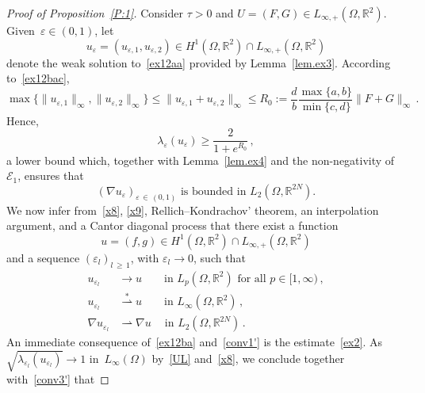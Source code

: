\documentclass[10pt]{amsart}
\theoremstyle{definition}\newtheorem{defi}[theo]{Definition}\newtheorem{rema}[theo]{Remark}\newtheorem{exam}[theo]{Example}\newtheorem{exem}[theo]{Example}\newtheorem{nota}[theo]{Notation}
\newcommand{\bbR}{\mathbb{R}}
\newcommand{\clE}{\mathcal{E}}
\begin{document}
\begin{proof}[Proof of Proposition~\ref{P:1}]
Consider $\tau>0$ and $U=(F,G)\in L_{\infty,+}(\Omega,\bbR^2)$. Given~$\varepsilon\in (0,1)$, let
\begin{equation*}
u_\varepsilon =(u_{\varepsilon,1},u_{\varepsilon,2}) \in H^1\left(\Omega,\bbR^2\right)\cap L_{\infty,+}\left(\Omega,\bbR^2\right)
\end{equation*}
denote the weak solution to~\eqref{ex12aa} provided by Lemma~\ref{lem.ex3}. According to~\eqref{ex12bac},
\begin{equation}\label{x8}
\max\{\|u_{\varepsilon,1}\|_\infty, \| u_{\varepsilon,2}\|_\infty \} \le\|u_{\varepsilon,1}+ u_{\varepsilon,2}\|_\infty \le R_0 := \frac{d}{b} \frac{\max\{a,b\}}{\min\{c,d\}} \|F+G\|_\infty\,. 
\end{equation}
Hence,
\begin{equation*}
\lambda_\varepsilon(u_\varepsilon) \ge \frac{2}{1+e^{R_0}}\,,
\end{equation*}
a lower bound which, together with Lemma~\ref{lem.ex4} and the non-negativity of $\clE_1$, ensures that
\begin{equation}\label{x9}
(\nabla u_{\varepsilon})_{\varepsilon\,\in\,(0,1)} \text{ is bounded in }L_2\left(\Omega,\bbR^{2N}\right). 
\end{equation}
We now infer from~\eqref{x8}, \eqref{x9}, Rellich--Kondrachov' theorem, an interpolation argument, and a Cantor diagonal process that there exist a function
\begin{equation*}
u=(f,g)\in H^1\left(\Omega,\bbR^2\right)\cap L_{\infty,+}\left(\Omega,\bbR^2\right)
\end{equation*}
and a sequence $(\varepsilon_l)_{l\,\ge\,1}$, with $\varepsilon_l\to 0$, such that
\begin{align}
u_{\varepsilon_l}&\to u\qquad\text{in }L_p\left(\Omega,\bbR^2\right)\text{ for all }p\in [1,\infty)\,,\label{conv1'}
\\[1ex] u_{\varepsilon_l}&\overset{*}\rightharpoonup u\qquad \text{in }L_\infty\left(\Omega,\bbR^2\right)\,,\label{conv2'}
\\[1ex]
\nabla u_{\varepsilon_l}&\rightharpoonup \nabla u\quad\: \text{in }L_2\left(\Omega,\bbR^{2N}\right)\,.\label{conv3'}
\end{align}
An immediate consequence of~\eqref{ex12ba} and~\eqref{conv1'} is the estimate~\eqref{ex2}. As~${\sqrt{\lambda_{\varepsilon_l}(u_{\varepsilon_l})}\to \!1}$ in~${L_\infty(\Omega)}$ by~\eqref{UL} and~\eqref{x8}, we conclude together with~\eqref{conv3'} that

\end{proof}
\end{document}

